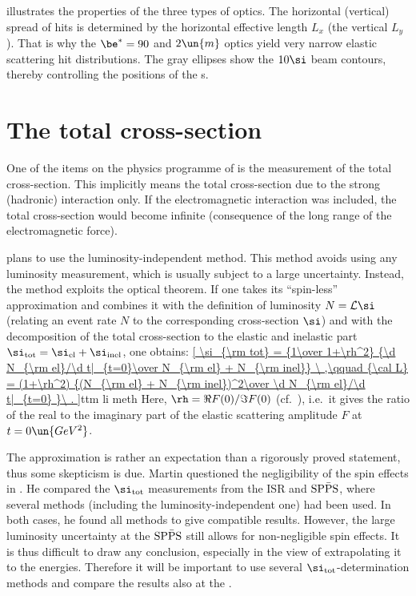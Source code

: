  illustrates the properties of the three types of optics. The horizontal (vertical) spread of hits is determined by the horizontal effective length $L_x$ (the vertical $L_y$). That is why the $\be^* = 90$ and $2\un{m}$ optics yield very narrow elastic scattering hit distributions. The gray ellipses show the $10\si$ beam contours, thereby controlling the positions of the s.




\section[ttm tcs]{The total cross-section}

One of the items on the physics programme of  is the measurement of the total cross-section. This implicitly means the total cross-section due to the strong (hadronic) interaction only. If the electromagnetic interaction was included, the total cross-section would become infinite (consequence of the long range of the electromagnetic force).

 plans to use the luminosity-independent method. This method avoids using any luminosity measurement, which is usually subject to a large uncertainty. Instead, the method exploits the optical theorem. If one takes its ``spin-less'' approximation  and combines it with the definition of luminosity $N = {\cal L} \si$ (relating an event rate $N$ to the corresponding cross-section $\si$) and with the decomposition of the total cross-section to the elastic and inelastic part $\si_{\rm tot} = \si_{\rm el} + \si_{\rm inel}$, one obtains:
\eqref{
	\si_{\rm tot} = {1\over 1+\rh^2} {\d N_{\rm el}/\d t|_{t=0}\over N_{\rm el} + N_{\rm inel}}
	\ ,\qquad
	{\cal L} = (1+\rh^2) {(N_{\rm el} + N_{\rm inel})^2\over \d N_{\rm el}/\d t|_{t=0} }\ .
}{ttm li meth}
Here, $\rh = \Re F(0) / \Im F(0)$ (cf.~), i.e.~it gives the ratio of the real to the imaginary part of the elastic scattering amplitude $F$ at $t = 0\un{GeV^2}$.

The approximation  is rather an expectation than a rigorously proved statement, thus some skepticism is due. Martin questioned the negligibility of the spin effects in . He compared the $\si_{\rm tot}$ measurements from the ISR and $\rm SP\bar PS$, where several methods (including the luminosity-independent one) had been used. In both cases, he found all methods to give compatible results. However, the large luminosity uncertainty at the $\rm SP\bar PS$ still allows for non-negligible spin effects. It is thus difficult to draw any conclusion, especially in the view of extrapolating it to the  energies. Therefore it will be important to use several $\si_{\rm tot}$-determination methods and compare the results also at the .

